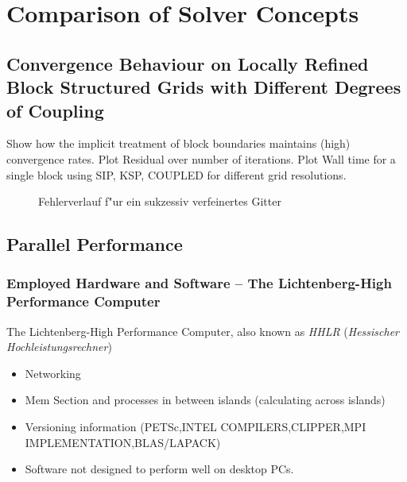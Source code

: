   \section{Comparison of Solver Concepts}
  
     \subsection{Convergence Behaviour on Locally Refined Block Structured Grids with Different Degrees of Coupling}

      Show how the implicit treatment of block boundaries maintains (high) convergence rates. Plot Residual over number of iterations. Plot Wall time for a single block using SIP, KSP, COUPLED for different grid resolutions.

\begin{figure} \centering
{}
\caption{Fehlerverlauf f"ur ein sukzessiv verfeinertes Gitter}
\label{fig:fehler}
\end{figure}


\subsection{Parallel Performance}
\subsubsection{Employed Hardware and Software -- The Lichtenberg-High Performance Computer }

The Lichtenberg-High Performance Computer, also known as \emph{HHLR} (\emph{Hessischer Hochleistungsrechner})
\begin{itemize}
\item Networking
\item Mem Section and processes in between islands (calculating across islands)
\item Versioning information (PETSc,INTEL COMPILERS,CLIPPER,MPI IMPLEMENTATION,BLAS/LAPACK)
\item Software not designed to perform well on desktop PCs.
\end{itemize}

